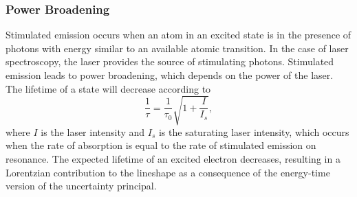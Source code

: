 \noindent \subsubsection{Power Broadening}
Stimulated emission occurs when an atom in an excited state is in the presence of photons with energy similar to an available atomic transition. In the case of laser spectroscopy, the laser provides the source of stimulating photons. Stimulated emission leads to power broadening, which depends on the power of the laser. The lifetime of a state will decrease according to
\begin{equation}
\frac{1}{\tau}= \frac{1}{\tau_0}\sqrt{1+\frac{I}{I_s}},
\end{equation}
where $I$ is the laser intensity and $I_s$ is the saturating laser intensity, which occurs when the rate of absorption is equal to the rate of stimulated emission on resonance. The expected lifetime of an excited electron decreases, resulting in a Lorentzian contribution to the lineshape as a consequence of the energy-time version of the uncertainty principal\cite{TomT}.
